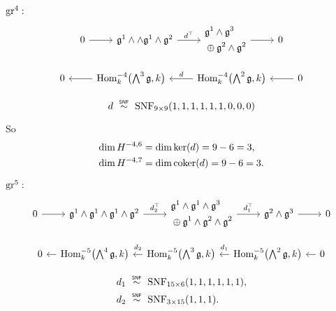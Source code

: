 $\operatorname{gr}^{4}:$
\[
  \begin{tikzcd}[ampersand replacement=\&]
    0 \ar[r] \& \lie{g}^{1} \wedge \wedge \lie{g}^{1} \wedge \lie{g}^{2} \ar[r,"d^{\top}"] \& \begin{aligned} &\lie{g}^{1} \wedge \lie{g}^{3} \\ &\oplus \lie{g}^{2} \wedge \lie{g}^{2} \end{aligned} \ar[r] \& 0
  \end{tikzcd}
\]

\[
  \begin{tikzcd}
    0 & \ar[l] \Hom_{k}^{-4}\bigl( \bigwedge^{3}\lie{g}, k \bigr) & \ar[l,"d"'] \Hom_{k}^{-4}\bigl( \bigwedge^{2}\lie{g}, k \bigr) &  \ar[l] 0
  \end{tikzcd}
\]

\begin{equation*}
  d \snfsim \SNF_{9\times9}(1,1,1,1,1,1,0,0,0)
\end{equation*}

So
\begin{align*}
  \dim H^{-4,6} &= \dim \operatorname{ker}(d) = 9-6 = 3, \\
  \dim H^{-4,7} &= \dim \operatorname{coker}(d) = 9-6 = 3.
\end{align*}

$\operatorname{gr}^{5}:$
\[
  \begin{tikzcd}[ampersand replacement=\&]
    0 \ar[r] \& \lie{g}^{1} \wedge \lie{g}^{1} \wedge \lie{g}^{1} \wedge \lie{g}^{2} \ar[r,"d_{2}^{\top}"] \& \begin{aligned} &\lie{g}^{1} \wedge \lie{g}^{1} \wedge \lie{g}^{3} \\ &\oplus \lie{g}^{1} \wedge \lie{g}^{2} \wedge \lie{g}^{2} \end{aligned} \ar[r,"d_{1}^{\top}"] \& \lie{g}^{2} \wedge \lie{g}^{3} \ar[r] \& 0
  \end{tikzcd}
\]

\[
  \begin{tikzcd}[column sep=1em]
    0 & \ar[l] \Hom_{k}^{-5}\bigl( \bigwedge^{4}\lie{g}, k \bigr) & \ar[l,"d_{2}"' {yshift=2pt}] \Hom_{k}^{-5}\bigl( \bigwedge^{3}\lie{g}, k \bigr) & \ar[l,"d_{1}"' {yshift=2pt}] \Hom_{k}^{-5}\bigl( \bigwedge^{2}\lie{g}, k \bigr) & \ar[l] 0
  \end{tikzcd}
\]

\begin{align*}
  d_{1} &\snfsim \SNF_{15\times6}(1,1,1,1,1,1), \\
  d_{2} &\snfsim \SNF_{3\times15}(1,1,1).
\end{align*}

